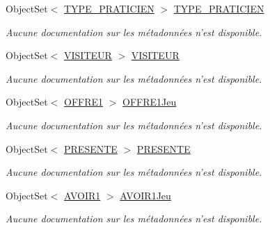 \begin{DoxyCompactItemize}
Object\-Set$<$ \hyperlink{class_model_1_1_t_y_p_e___p_r_a_t_i_c_i_e_n}{T\-Y\-P\-E\-\_\-\-P\-R\-A\-T\-I\-C\-I\-E\-N} $>$ \hyperlink{class_model_1_1_b_d_d___s_i_o7_entities_a01d5e4265274c8d01bf75377b41cb595}{T\-Y\-P\-E\-\_\-\-P\-R\-A\-T\-I\-C\-I\-E\-N}
\begin{DoxyCompactList}\small\item\em Aucune documentation sur les métadonnées n'est disponible. \end{DoxyCompactList}\item 
Object\-Set$<$ \hyperlink{class_model_1_1_v_i_s_i_t_e_u_r}{V\-I\-S\-I\-T\-E\-U\-R} $>$ \hyperlink{class_model_1_1_b_d_d___s_i_o7_entities_a6bea95538ec6b785b1b5bf6e8d9f5efd}{V\-I\-S\-I\-T\-E\-U\-R}
\begin{DoxyCompactList}\small\item\em Aucune documentation sur les métadonnées n'est disponible. \end{DoxyCompactList}\item 
Object\-Set$<$ \hyperlink{class_model_1_1_o_f_f_r_e1}{O\-F\-F\-R\-E1} $>$ \hyperlink{class_model_1_1_b_d_d___s_i_o7_entities_a3430fda13ad472d300b07c477b43b6b6}{O\-F\-F\-R\-E1\-Jeu}
\begin{DoxyCompactList}\small\item\em Aucune documentation sur les métadonnées n'est disponible. \end{DoxyCompactList}\item 
Object\-Set$<$ \hyperlink{class_model_1_1_p_r_e_s_e_n_t_e}{P\-R\-E\-S\-E\-N\-T\-E} $>$ \hyperlink{class_model_1_1_b_d_d___s_i_o7_entities_aacd30e8555ccb03835789fea50e96677}{P\-R\-E\-S\-E\-N\-T\-E}
\begin{DoxyCompactList}\small\item\em Aucune documentation sur les métadonnées n'est disponible. \end{DoxyCompactList}\item 
Object\-Set$<$ \hyperlink{class_model_1_1_a_v_o_i_r1}{A\-V\-O\-I\-R1} $>$ \hyperlink{class_model_1_1_b_d_d___s_i_o7_entities_ab937f73f4b02147372c41c94fa4c6249}{A\-V\-O\-I\-R1\-Jeu}
\begin{DoxyCompactList}\small\item\em Aucune documentation sur les métadonnées n'est disponible. \end{DoxyCompactList}\end{DoxyCompactItemize}


